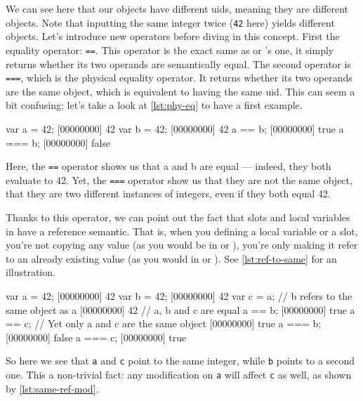 \documentclass[openright,twoside,12pt]{report}
\begin{document}
We can see here that our objects have different uids, meaning they are
different objects. Note that inputting the same integer twice
(\texttt{42} here) yields different objects. Let's introduce new
operators before diving in this concept. First the equality operator:
\texttt{==}. This operator is the exact same as \C or \Cxx's one, it
simply returns whether its two operands are semantically equal. The
second operator is \texttt{===}, which is the physical equality
operator. It returns whether its two operands are the same object,
which is equivalent to having the same uid. This can seem a bit
confusing; let's take a look at \autoref{lst:phy-eq} to have a first example.

\begin{urbiscript}[caption=Physical equality operator,
label=lst:phy-eq]
var a = 42;
[00000000] 42
var b = 42;
[00000000] 42
a == b;
[00000000] true
a === b;
[00000000] false
\end{urbiscript}

Here, the \texttt{==} operator shows us that a and b are equal ---
indeed, they both evaluate to 42. Yet, the \texttt{===} operator show
us that they are not the same object, that they are two different
instances of integers, even if they both equal 42.

Thanks to this operator, we can point out the fact that slots and
local variables in \urbi have a reference semantic. That is, when you
defining a local variable or a slot, you're not copying any value (as
you would be in \C or \Cxx), you're only making it refer to an already
existing value (as you would in \ruby or \java). See \autoref{lst:ref-to-same}
for an illustration.

\begin{urbiscript}[caption=Two references to the same object,
  label=lst:ref-to-same, name=same]
var a = 42;
[00000000] 42
var b = 42;
[00000000] 42
var c = a; // b refers to the same object as a
[00000000] 42
// a, b and c are equal
a == b;
[00000000] true
a == c;
// Yet only a and c are the same object
[00000000] true
a === b;
[00000000] false
a === c;
[00000000] true
\end{urbiscript}

So here we see that \lstinline|a| and \lstinline|c| point to the same
integer, while \lstinline|b| points to a second one. This a
non-trivial fact: any modification on \lstinline|a| will affect
\lstinline|c| as well, as shown by \autoref{lst:same-ref-mod}.
\end{document}
